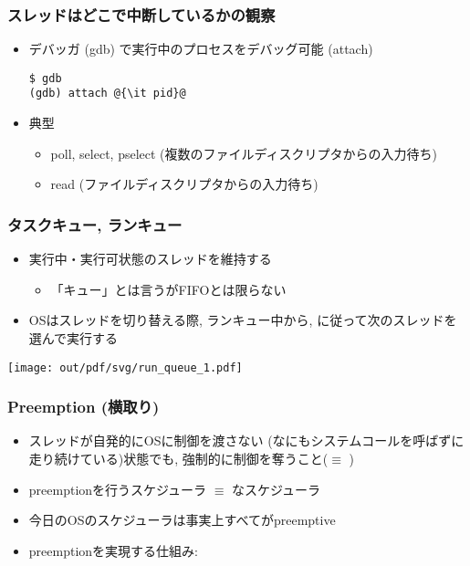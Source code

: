 \documentclass[12pt,dvipdfmx]{beamer}
\begin{document}
\begin{frame}[fragile]
  \frametitle{スレッドはどこで中断しているかの観察}
  \begin{itemize}
  \item デバッガ (gdb) で実行中のプロセスをデバッグ可能 (attach)
\begin{lstlisting}
$ gdb
(gdb) attach @{\it pid}@
\end{lstlisting} %
\item 典型
  \begin{itemize}
  \item poll, select, pselect (複数のファイルディスクリプタからの入力待ち)
  \item read (ファイルディスクリプタからの入力待ち)
  \end{itemize}
\end{itemize}
\end{frame}

\begin{frame}
  \frametitle{タスクキュー, ランキュー}
  \begin{itemize}
  \item 実行中・実行可状態のスレッドを維持する
    \begin{itemize}
    \item 「キュー」とは言うがFIFOとは限らない
    \end{itemize}
  \item OSはスレッドを切り替える際,
    ランキュー中から, に従って次のスレッドを選んで実行する
  \end{itemize}

  \begin{center}
    \texttt{[image: out/pdf/svg/run\_queue\_1.pdf]}
  \end{center}
  
\end{frame}

\begin{frame}
  \frametitle{Preemption (横取り)}
  \begin{itemize}
  \item スレッドが自発的にOSに制御を渡さない
    (なにもシステムコールを呼ばずに走り続けている)状態でも,
    強制的に制御を奪うこと($\equiv$ )
  \item preemptionを行うスケジューラ $\equiv$ なスケジューラ
  \item 今日のOSのスケジューラは事実上すべてがpreemptive
  \item preemptionを実現する仕組み: 
  \end{itemize}
\end{frame}
\end{document}
